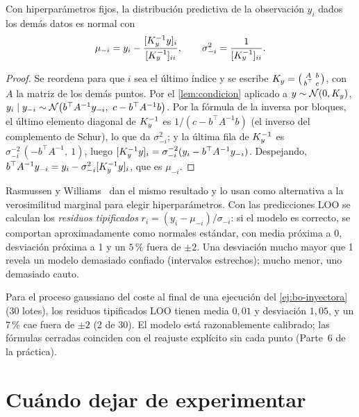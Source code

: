 \begin{teorema}\label{teo:loo}
Con hiperparámetros fijos, la distribución predictiva de la observación $y_i$ dados los demás datos es normal con
\[
\mu_{-i}=y_i-\frac{[K_{y}^{-1}y]_i}{[K_{y}^{-1}]_{ii}},\qquad \sigma_{-i}^2=\frac{1}{[K_{y}^{-1}]_{ii}} .
\]
\end{teorema}

\begin{proof}
Se reordena para que $i$ sea el último índice y se escribe $K_{y}=\bigl(\begin{smallmatrix}A&b\\b^\top&c\end{smallmatrix}\bigr)$, con $A$ la matriz de los demás puntos. Por el \cref{lem:condicion} aplicado a $y\sim\mathcal{N}(0,K_{y})$, $y_i\mid y_{-i}\sim\N\bigl(b^\top A^{-1}y_{-i},\ c-b^\top A^{-1}b\bigr)$. Por la fórmula de la inversa por bloques, el último elemento diagonal de $K_{y}^{-1}$ es $1/(c-b^\top A^{-1}b)$ (el inverso del complemento de Schur), lo que da $\sigma_{-i}^2$; y la última fila de $K_{y}^{-1}$ es $\sigma_{-i}^{-2}\,(-b^\top A^{-1},\ 1)$, luego $[K_{y}^{-1}y]_i=\sigma_{-i}^{-2}(y_i-b^\top A^{-1}y_{-i})$. Despejando, $b^\top A^{-1}y_{-i}=y_i-\sigma_{-i}^2[K_{y}^{-1}y]_i$, que es $\mu_{-i}$.
\end{proof}

Rasmussen y Williams~\cite[cap.~5]{rw} dan el mismo resultado y lo usan como alternativa a la verosimilitud marginal para elegir hiperparámetros. Con las predicciones LOO se calculan los \emph{residuos tipificados} $r_i=(y_i-\mu_{-i})/\sigma_{-i}$: si el modelo es correcto, se comportan aproximadamente como normales estándar, con media próxima a 0, desviación próxima a 1 y un $5\,\%$ fuera de $\pm2$. Una desviación mucho mayor que 1 revela un modelo demasiado confiado (intervalos estrechos); mucho menor, uno demasiado cauto.

\begin{ejemplo}\label{ej:loo}
Para el proceso gaussiano del coste al final de una ejecución del \cref{ej:bo-inyectora} (30 lotes), los residuos tipificados LOO tienen media $0{,}01$ y desviación $1{,}05$, y un $7\,\%$ cae fuera de $\pm2$ (2 de 30). El modelo está razonablemente calibrado; las fórmulas cerradas coinciden con el reajuste explícito sin cada punto (Parte~6 de la práctica).
\end{ejemplo}

\section{Cuándo dejar de experimentar}


